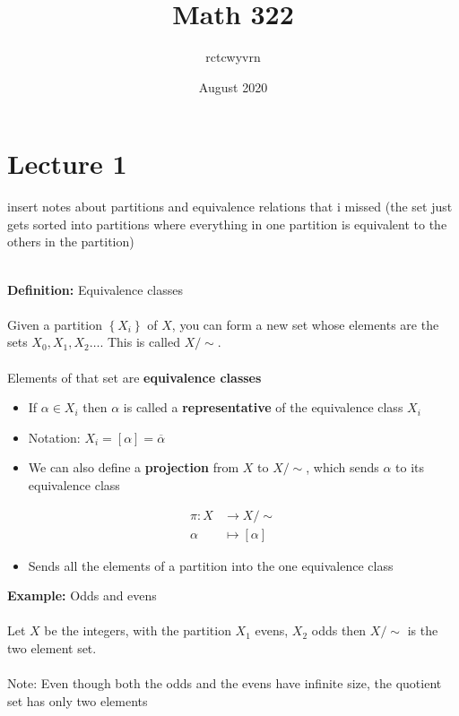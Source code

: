 \documentclass{article}
\title{Math 322}
\author{rctcwyvrn}
\date{August 2020}
\begin{document}
\maketitle

\section{Lecture 1}
insert notes about partitions and equivalence relations that i missed (the set just gets sorted into partitions where everything in one partition is equivalent to the others in the partition) \\
~\\

\begin{definition} 
\textbf{Definition:} Equivalence classes \\
~\\
Given a partition $\left\{X_i\right\}$ of $X$, you can form a new set whose elements are the sets $X_0, X_1, X_2 \ldots$. This is called $X/ \sim$. \\
~\\ 
Elements of that set are {\color{blue} \textbf{equivalence classes}}
\begin{itemize}
	\item If $\alpha\in X_i$ then $\alpha$ is called a {\color{blue} \textbf{representative}} of the equivalence class $X_i$
	\item Notation: $X_i = \left[\alpha\right] = \overline{\alpha}$
	\item We can also define a {\color{blue} \textbf{projection}} from $X$ to $X /\sim$, which sends $\alpha$ to its equivalence class
\end{itemize}
\begin{align}
	\pi: X &\to X /\sim \\
           \alpha &\mapsto \left[\alpha\right]
\end{align}
\begin{itemize}
	\item Sends all the elements of a partition into the one equivalence class
\end{itemize}
\end{definition}
\begin{example} 
\textbf{Example:} Odds and evens \\
~\\
Let $X$ be the integers, with the partition $X_1$ evens, $X_2$ odds then $X /\sim$ is the two element set. ~\\
~\\
Note: Even though both the odds and the evens have infinite size, the quotient set has only two elements
\end{example}
\end{document}
